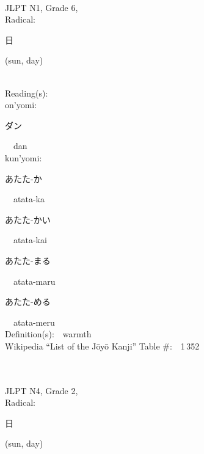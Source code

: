 \begin{multicols}{2}
{\fontsize{34pt}{40pt}  }\ \ \\  %
{JLPT N1, Grade 6, \\Radical:\ \ {\begin{CJK}{UTF8}{min} 日 \end{CJK}} (sun, day) } \\
Reading(s):\ \ \\
{\hspace*{1em}}on'yomi:\ \ \\
{\hspace*{2em}}{\begin{CJK}{UTF8}{min} ダン \end{CJK}}\ \ dan\ \ \\
{\hspace*{1em}}kun'yomi:\ \ \\
{\hspace*{2em}}{\begin{CJK}{UTF8}{min} あたた-か \end{CJK}}\ \ atata-ka\ \ \\
{\hspace*{2em}}{\begin{CJK}{UTF8}{min} あたた-かい \end{CJK}}\ \ atata-kai\ \ \\
{\hspace*{2em}}{\begin{CJK}{UTF8}{min} あたた-まる \end{CJK}}\ \ atata-maru\ \ \\
{\hspace*{2em}}{\begin{CJK}{UTF8}{min} あたた-める \end{CJK}}\ \ atata-meru\ \ \\
Definition(s):\ \ warmth \\
Wikipedia ``List of the J\=oy\=o Kanji'' Table \#:\ \ 1\,352 \\
\ \ \\
{\fontsize{34pt}{40pt}  }\ \ \\  %
{JLPT N4, Grade 2, \\Radical:\ \ {\begin{CJK}{UTF8}{min} 日 \end{CJK}} (sun, day) } \\

\end{multicols}

